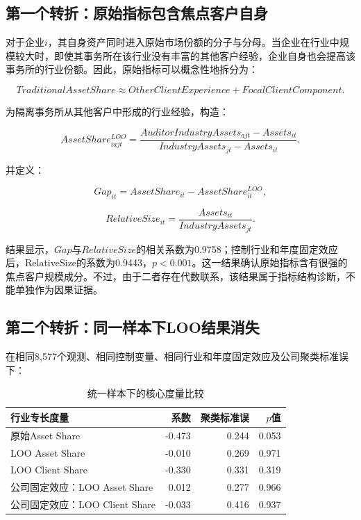 \documentclass[12pt,a4paper]{article}
\begin{document}
\subsection{第一个转折：原始指标包含焦点客户自身}

对于企业$i$，其自身资产同时进入原始市场份额的分子与分母。当企业在行业中规模较大时，即使其事务所在该行业没有丰富的其他客户经验，企业自身也会提高该事务所的行业份额。因此，原始指标可以概念性地拆分为：

\begin{equation}
TraditionalAssetShare
\approx OtherClientExperience+FocalClientComponent.
\end{equation}

为隔离事务所从其他客户中形成的行业经验，构造：

\begin{equation}
AssetShare^{LOO}_{iajt}=
\frac{AuditorIndustryAssets_{ajt}-Assets_{it}}
{IndustryAssets_{jt}-Assets_{it}}.
\end{equation}

并定义：

\begin{equation}
Gap_{it}=AssetShare_{it}-AssetShare^{LOO}_{it},
\end{equation}

\begin{equation}
RelativeSize_{it}=\frac{Assets_{it}}{IndustryAssets_{jt}}.
\end{equation}

结果显示，$Gap$与$RelativeSize$的相关系数为0.9758；控制行业和年度固定效应后，RelativeSize的系数为0.9443，$p<0.001$。这一结果确认原始指标含有很强的焦点客户规模成分。不过，由于二者存在代数联系，该结果属于指标结构诊断，不能单独作为因果证据。

\subsection{第二个转折：同一样本下LOO结果消失}

在相同8,577个观测、相同控制变量、相同行业和年度固定效应及公司聚类标准误下：

\begin{table}[htbp]
\centering
\caption{统一样本下的核心度量比较}
\begin{tabular}{lrrr}
\toprule
行业专长度量 & 系数 & 聚类标准误 & $p$值 \\
\midrule
原始Asset Share & -0.473 & 0.244 & 0.053 \\
LOO Asset Share & -0.010 & 0.269 & 0.971 \\
LOO Client Share & -0.330 & 0.331 & 0.319 \\
公司固定效应：LOO Asset Share & 0.012 & 0.277 & 0.966 \\
公司固定效应：LOO Client Share & -0.033 & 0.416 & 0.937 \\
\bottomrule
\end{tabular}
\end{table}
\end{document}
